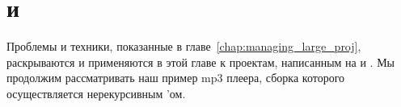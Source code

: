 \chapter{\Clang{} и \Cplusplus{}}
\label{chap:c_and_cpp}

Проблемы и техники, показанные в главе~\ref{chap:managing_large_proj},
раскрываются и применяются в этой главе к проектам, написанным на
\Clang{} и \Cplusplus{}. Мы продолжим рассматривать наш пример mp3
плеера, сборка которого осуществляется нерекурсивным \Makefile{}'ом.







